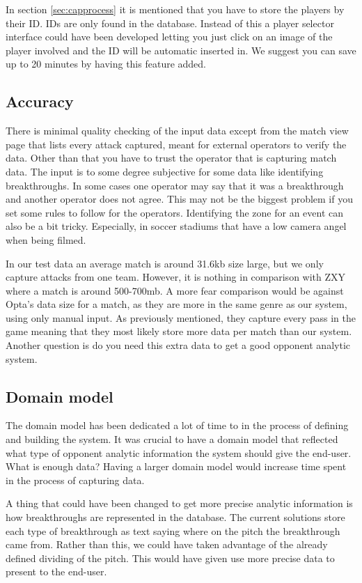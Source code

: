 In section \ref{sec:capprocess} it is mentioned that you have to store the players by their ID. IDs are only found in the database. Instead of this a player selector interface could have been developed letting you just click on an image of the player involved and the ID will be automatic inserted in. We suggest you can save up to 20 minutes by having this feature added.

\subsection{Accuracy}

There is minimal quality checking of the input data except from the match view page that lists every attack captured, meant for external operators to verify the data. Other than that you have to trust the operator that is capturing match data. The input is to some degree subjective for some data like identifying breakthroughs. In some cases one operator may say that it was a breakthrough and another operator does not agree. This may not be the biggest problem if you set some rules to follow for the operators. Identifying the zone for an event can also be a bit tricky. Especially, in soccer stadiums that have a low camera angel when being filmed. 

In our test data an average match is around 31.6kb size large, but we only capture attacks from one team. However, it is nothing in comparison with ZXY where a match is around 500-700mb. A more fear comparison would be against Opta’s data size for a match, as they are more in the same genre as our system, using only manual input. As previously mentioned, they capture every pass in the game meaning that they most likely store more data per match than our system. Another question is do you need this extra data to get a good opponent analytic system.

\subsection{Domain model}
The domain model has been dedicated a lot of time to in the process of defining and building the system. It was crucial to have a domain model that reflected what type of opponent analytic information the system should give the end-user. What is enough data? Having a larger domain model would increase time spent in the process of capturing data. 

A thing that could have been changed to get more precise analytic information is how breakthroughs are represented in the database. The current solutions store each type of breakthrough as text saying where on the pitch the breakthrough came from. Rather than this, we could have taken advantage of the already defined dividing of the pitch. This would have given use more precise data to present to the end-user.

